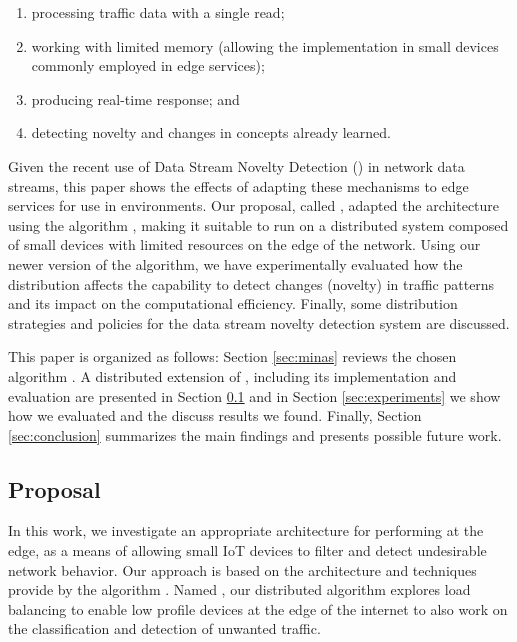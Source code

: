 \begin{enumerate}[label=(\emph{\roman*})]
    \item processing traffic data with a single read;
    \item working with limited memory (allowing the implementation in small
    devices commonly employed in edge services);
    \item producing real-time response; and
    \item detecting novelty and changes in concepts already learned.
\end{enumerate}

Given the recent \cite{Viegas2019,AndreoniLopez2019,DaCosta2019a} use of Data Stream Novelty
Detection (\nd) in network data streams, this paper shows the effects of
adapting these mechanisms to edge services for use in \iot environments.
Our proposal, called \mfog, adapted the \arch
architecture \cite{Cassales2019a} using the \nd algorithm \minas
\cite{Faria2013Minas,Faria2015minas}, making it suitable to run
on a distributed system composed of small devices with limited
resources on the edge of the network.
Using our newer version of the \minas algorithm, we have experimentally evaluated 
how the distribution 
affects the capability to detect changes (novelty) in
traffic patterns and its impact on the computational efficiency.
Finally, some distribution strategies and policies for the data stream
novelty detection system are discussed.

This paper is organized as follows:
Section \ref{sec:minas} reviews the chosen \nd algorithm \minas.
A distributed extension of \minas, including its
implementation and evaluation are presented in Section \ref{sec:prop}
and in Section \ref{sec:experiments} we show how we evaluated \mfog and
the discuss results we found.
Finally, Section \ref{sec:conclusion} summarizes the main findings and presents
possible future work.

\subsection{Proposal}
\label{sec:prop}

In this work, we investigate an appropriate architecture for performing \nd at
the edge, as a means of allowing small IoT devices to filter and detect undesirable
network behavior.
Our approach is based on the \arch architecture \cite{Cassales2019a} and \nd
techniques provide by the \minas algorithm \cite{Faria2015minas}.
Named \mfog, our distributed algorithm explores load balancing to enable low
profile devices at the edge of the internet to also work on the classification
and detection of unwanted traffic.

